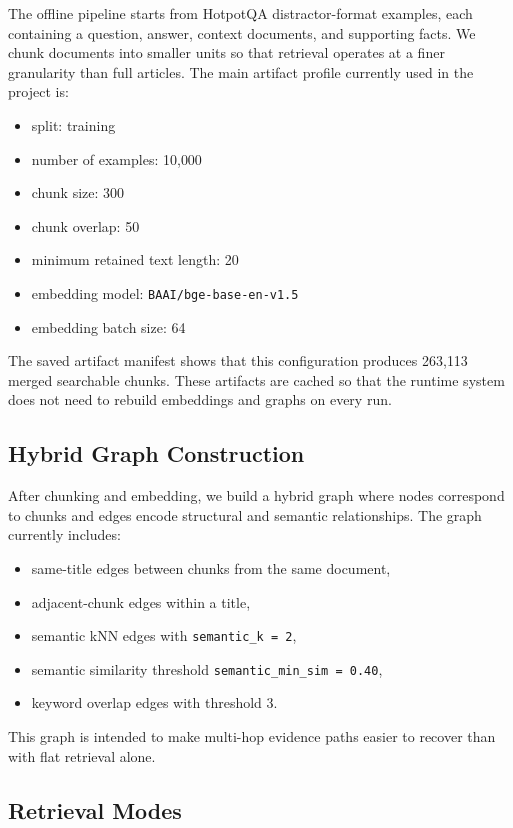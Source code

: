 \documentclass[10pt]{article}
\begin{document}
The offline pipeline starts from HotpotQA distractor-format examples, each containing a question, answer, context documents, and supporting facts. We chunk documents into smaller units so that retrieval operates at a finer granularity than full articles. The main artifact profile currently used in the project is:
\begin{itemize}
    \item split: training
    \item number of examples: 10{,}000
    \item chunk size: 300
    \item chunk overlap: 50
    \item minimum retained text length: 20
    \item embedding model: \texttt{BAAI/bge-base-en-v1.5}
    \item embedding batch size: 64
\end{itemize}

The saved artifact manifest shows that this configuration produces 263{,}113 merged searchable chunks. These artifacts are cached so that the runtime system does not need to rebuild embeddings and graphs on every run.

\subsection{Hybrid Graph Construction}

After chunking and embedding, we build a hybrid graph where nodes correspond to chunks and edges encode structural and semantic relationships. The graph currently includes:
\begin{itemize}
    \item same-title edges between chunks from the same document,
    \item adjacent-chunk edges within a title,
    \item semantic kNN edges with \texttt{semantic\_k = 2},
    \item semantic similarity threshold \texttt{semantic\_min\_sim = 0.40},
    \item keyword overlap edges with threshold 3.
\end{itemize}

This graph is intended to make multi-hop evidence paths easier to recover than with flat retrieval alone.

\subsection{Retrieval Modes}
\end{document}
